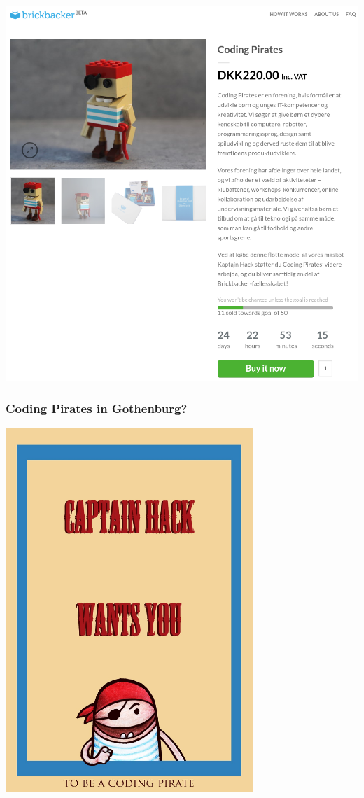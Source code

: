 \documentclass{beamer}
\begin{document}
\begin{frame}
  \centerline{\includegraphics[width=\textwidth]{imagery/brickbacker}}
\end{frame}


\begin{frame}
  \frametitle{Coding Pirates in Gothenburg?}
  \begin{center}
    \includegraphics[origin=c,angle=-20,width=0.7\textwidth]{imagery/wanted}
  \end{center}

\end{frame}
\end{document}
